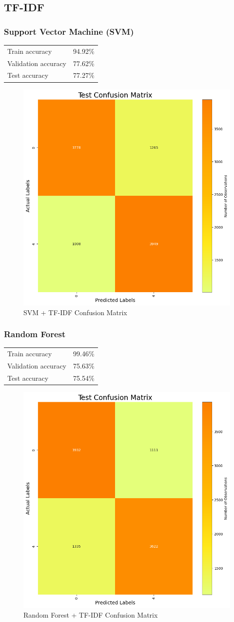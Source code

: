 \documentclass[12pt]{article}
\begin{document}
\pagebreak

\subsection{TF-IDF}

\subsubsection{Support Vector Machine (SVM)}

\begin{tabular}{lr}
    Train accuracy & 94.92\%\\
    Validation accuracy & 77.62\%\\
    Test accuracy & 77.27\%\\
\end{tabular}

\begin{figure}[h!]
    \centering
    \includegraphics[width=.3\textwidth]{P2.TFIDF.1.png}
    \caption{SVM + TF-IDF Confusion Matrix}
    \label{fig:2.TDIDF.1}
\end{figure}

\subsubsection{Random Forest}

\begin{tabular}{lr}
    Train accuracy & 99.46\%\\
    Validation accuracy & 75.63\%\\
    Test accuracy & 75.54\%\\
\end{tabular}

\begin{figure}[h!]
    \centering
    \includegraphics[width=.3\textwidth]{P2.TFIDF.2.png}
    \caption{Random Forest + TF-IDF Confusion Matrix}
    \label{fig:2.TFIDF.2}
\end{figure}
\end{document}
